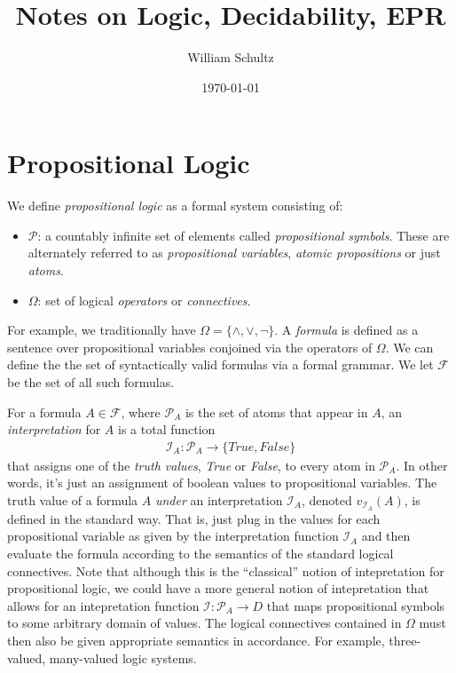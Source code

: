 \documentclass[10pt]{article}
\begin{document}
\title{Notes on Logic, Decidability, EPR}
\author{William Schultz}
\date{\today}

\maketitle
\tableofcontents

\newcommand{\propvars}{{\mathcal{P}}}
\newcommand{\A}{\forall}
\newcommand{\E}{\exists}

\section{Propositional Logic}

We define \textit{propositional logic} \cite{2012benari} as a formal system consisting of: 
\begin{itemize}
    \item $\propvars$: a countably infinite set of elements called \textit{propositional symbols}. These are alternately referred to as \textit{propositional variables}, \textit{atomic propositions} or just \textit{atoms}.
    \item $\Omega$: set of logical \textit{operators} or \textit{connectives}.
\end{itemize}
For example, we traditionally have $\Omega=\{\wedge, \vee, \neg\}$. A \textit{formula} is defined as a sentence over propositional variables conjoined via the operators of $\Omega$. We can define the the set of syntactically valid formulas via a formal grammar. We let $\mathcal{F}$ be the set of all such formulas. 

\newcommand{\interp}{\mathcal{I}}

For a formula $A \in \mathcal{F}$, where $\propvars_A$ is the set of atoms that appear in $A$,  an \textit{interpretation} for $A$ is a total function
\begin{align*}
    \mathcal{I}_A : \propvars_A \rightarrow \{True,False\}
\end{align*}
that assigns one of the \textit{truth values}, \textit{True} or \textit{False}, to every atom in $\propvars_A$. In other words, it's just an assignment of boolean values to propositional variables.  The truth value of a formula $A$ \textit{under} an interpretation $\mathcal{I}_A$, denoted $v_{\mathcal{I}_{A}}(A)$, is defined in the standard way. That is, just plug in the values for each propositional variable as given by the interpretation function $\mathcal{I}_A$ and then evaluate the formula according to the semantics of the standard logical connectives. Note that although this is the ``classical'' notion of intepretation for propositional logic, we could have a more general notion of intepretation that allows for an intepretation function $\mathcal{I} : \mathcal{P}_A \rightarrow D$ that maps propositional symbols to some arbitrary domain of values. The logical connectives contained in $\Omega$ must then also be given appropriate semantics in accordance. For example, three-valued, many-valued logic systems. 
\end{document}
